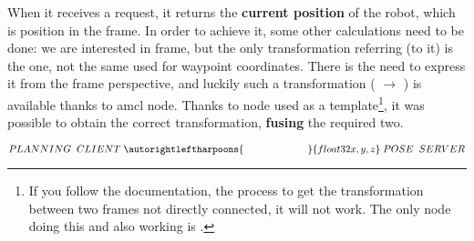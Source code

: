 When it receives a request, it returns the \textbf{current position} of the robot, which is  position in the  frame. In order to achieve it, some other calculations need to be done: we are interested in  frame, but the only transformation referring (to it) is the  one, not the same used for waypoint coordinates. There is the need to express it from the  frame perspective, and luckily such a transformation ( $\rightarrow$ ) is available thanks to \acrshort{amcl} node. 
Thanks to  node \cite{tfexample} used as a template\footnote{If you follow the documentation, the process to get the transformation between two frames not directly connected, it will not work. The only node doing this and also working is .}, it was possible to obtain the correct transformation, \textbf{fusing} the required two.

$$
    PLANNING \;\; CLIENT \; 
        \autorightleftharpoons{\;\;\;\;\;\;\;\;\;\;\;\;\;\;\;\;\;\;\;\;\;\;\;}{float32 x, y, z} \;
    POSE \;\; SERVER
$$
